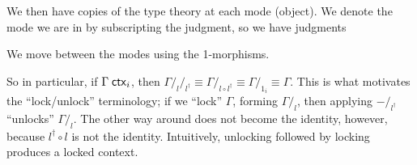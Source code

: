 \documentclass[fleqn,leqno]{article}
\begin{document}
We then have copies of the type theory at each mode (object). We denote the mode we are in by subscripting the judgment, so we have judgments
%
%
We move between the modes using the 1-morphisms.
%
%
So in particular, if $\Gamma \;\mathsf{ctx}_i$, then $\Gamma/_l/_{l^\dagger} \equiv \Gamma/_{l \circ l^\dagger} \equiv \Gamma/_{1_i} \equiv \Gamma$. This is what motivates the ``lock/unlock'' terminology; if we ``lock'' $\Gamma$, forming $\Gamma/_l$, then applying $-/_{l^\dagger}$ ``unlocks'' $\Gamma/_l$. The other way around does not become the identity, however, because $l^\dagger \circ l$ is not the identity. Intuitively, unlocking followed by locking produces a locked context.
\end{document}
